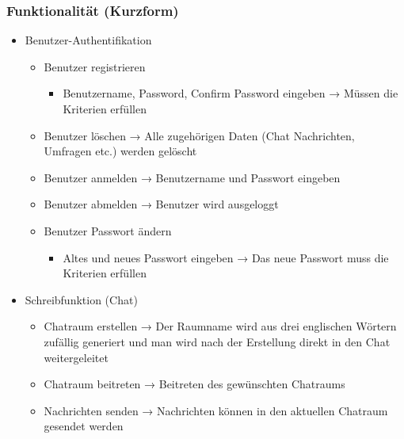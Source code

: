 \subsubsection{Funktionalität (Kurzform)}
\begin{itemize}
  \item Benutzer-Authentifikation
  \begin{itemize}
    \item Benutzer registrieren
    \begin{itemize}
      \item Benutzername, Password, Confirm Password eingeben
      \newline 
      → Müssen die Kriterien erfüllen
    \end{itemize}
    \item Benutzer löschen
    \newline
    → Alle zugehörigen Daten (Chat Nachrichten, Umfragen etc.) werden gelöscht
    \item Benutzer anmelden
    \newline
    → Benutzername und Passwort eingeben
    \item Benutzer abmelden
    \newline
    → Benutzer wird ausgeloggt
    \item Benutzer Passwort ändern
    \begin{itemize}
      \item Altes und neues Passwort eingeben
      \newline
      → Das neue Passwort muss die Kriterien erfüllen
    \end{itemize}
  \end{itemize}
  \item Schreibfunktion (Chat)
    \begin{itemize}
      \item Chatraum erstellen
      \newline
      → Der Raumname wird aus drei englischen Wörtern zufällig generiert und man wird nach der Erstellung direkt in den Chat weitergeleitet
      \item Chatraum beitreten
      \newline
      → Beitreten des gewünschten Chatraums
      \item Nachrichten senden
      \newline
      → Nachrichten können in den aktuellen Chatraum gesendet werden

\end{itemize}
\end{itemize}

